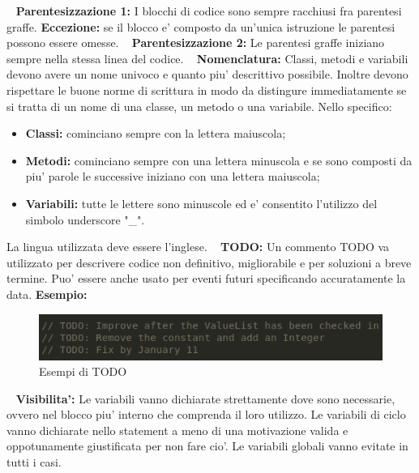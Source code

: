 ~\newline	
	\textbf{Parentesizzazione 1:} I blocchi di codice sono sempre racchiusi fra parentesi graffe.\newline 
	\textbf{Eccezione:} se il blocco e' composto da un'unica istruzione le parentesi possono essere omesse.\newline
	~\newline
	\textbf{Parentesizzazione 2:} Le parentesi graffe iniziano sempre nella stessa linea del codice. \newline
	~\newline
	\textbf{Nomenclatura:} Classi, metodi e variabili devono avere un nome univoco e quanto piu' descrittivo possibile. Inoltre devono rispettare le buone norme di scrittura in modo da distingure immediatamente se si tratta di un nome di una classe, un metodo o una variabile. Nello specifico:\newline
	\begin{itemize}
	\item \textbf{Classi:} cominciano sempre con la lettera maiuscola;
	\item \textbf{Metodi:} cominciano sempre con una lettera minuscola e se sono composti da piu' parole le successive iniziano con una lettera maiuscola;
	\item \textbf{Variabili:} tutte le lettere sono minuscole ed e' consentito l'utilizzo del simbolo underscore "\_".\newline
	\end{itemize}
	La lingua utilizzata deve essere l'inglese.\newline
	~\newline
	\textbf{TODO:} Un commento TODO va utilizzato per descrivere codice non definitivo, migliorabile e per soluzioni a breve termine. Puo' essere anche usato per eventi futuri specificando accuratamente la data.\newline
	\textbf{Esempio:}\newline
	\begin{figure}[!htbp]
		\centering
		\includegraphics{todo.png}
		\caption{Esempi di TODO}
	\end{figure}
	~\newline
	\textbf{Visibilita':} Le variabili vanno dichiarate strettamente dove sono necessarie, ovvero nel blocco piu' interno che comprenda il loro utilizzo. Le variabili di ciclo vanno dichiarate nello statement a meno di una motivazione valida e oppotunamente giustificata per non fare cio'. Le variabili globali vanno evitate in tutti i casi.\newline
